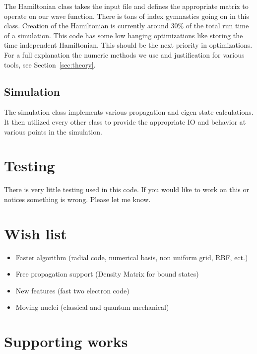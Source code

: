 \documentclass{article}
\begin{document}
The Hamiltonian class takes the input file and defines the appropriate matrix to operate on our wave function. There is tons of index gymnastics going on in this class. Creation of the Hamiltonian is currently around 30\% of the total run time of a simulation. This code has some low hanging optimizations like storing the time independent Hamiltonian. This should be the next priority in optimizations. For a full explanation the numeric methods we use and justification for various tools, see Section~\ref{sec:theory}.


\subsection{Simulation} %
\label{sub:simulation}
The simulation class implements various propagation and eigen state calculations. It then utilized every other class to provide the appropriate IO and behavior at various points in the simulation.



\section{Testing} %
\label{sec:testing}
There is very little testing used in this code. If you would like to work on this or notices something is wrong. Please let me know.

\section{Wish list} %
\label{sec:wish_list}
\begin{itemize}
    \item Faster algorithm (radial code, numerical basis, non uniform grid, RBF, ect.)
    \item Free propagation support (Density Matrix for bound states)
    \item New features (fast two electron code)
    \item Moving nuclei (classical and quantum mechanical)
\end{itemize}

\section{Supporting works} %
\label{sec:supporting_works}
\end{document}
